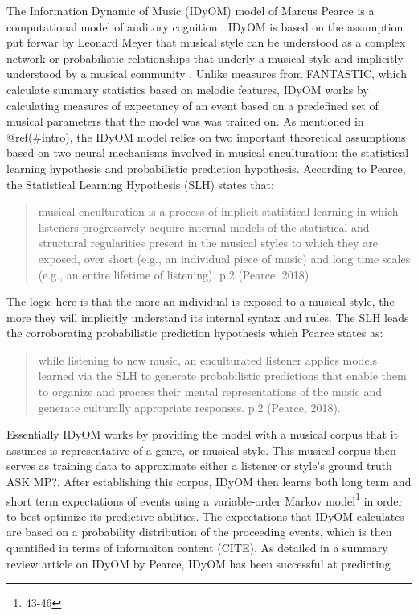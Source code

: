 \documentclass[]{book}
\let\rmarkdownfootnote\footnote%
\def\footnote{\protect\rmarkdownfootnote}
\begin{document}
The Information Dynamic of Music (IDyOM) model of Marcus Pearce is a computational model of auditory cognition \citep{pearceStatisticalLearningProbabilistic2018a}.
IDyOM is based on the assumption put forwar by Leonard Meyer that musical style can be understood as a complex network or probabilistic relationships that underly a musical style and implicitly understood by a musical community \citep{pearceAuditoryExpectationInformation2012, pearceConstructionEvaluationStatistical2005, pearceStatisticalLearningProbabilistic2018a}.
Unlike measures from FANTASTIC, which calculate summary statistics based on melodic features, IDyOM works by calculating measures of expectancy of an event based on a predefined set of musical parameters that the model was was trained on.
As mentioned in @ref(\#intro), the IDyOM model relies on two important theoretical assumptions based on two neural mechanisms involved in musical enculturation: the statistical learning hypothesis and probabilistic prediction hypothesis.
According to Pearce, the Statistical Learning Hypothesis (SLH) states that:

\begin{quote}
musical enculturation is a process of implicit statistical learning in which listeners progressively acquire internal models of the statistical and structural regularities present in the musical styles to which they are exposed, over short (e.g., an individual piece of music) and long time scales (e.g., an entire lifetime of listening). p.2 (Pearce, 2018)
\end{quote}

The logic here is that the more an individual is exposed to a musical style, the more they will implicitly understand its internal syntax and rules.
The SLH leads the corroborating probabilistic prediction hypothesis which Pearce states as:

\begin{quote}
while listening to new music, an enculturated listener applies models learned via the SLH to generate probabilistic predictions that enable them to organize and process their mental representations of the music and generate culturally appropriate responses. p.2 (Pearce, 2018).
\end{quote}

Essentially IDyOM works by providing the model with a musical corpus that it assumes is representative of a genre, or musical style.
This musical corpus then serves as training data to approximate either a listener or style's ground truth ASK MP?.
After establishing this corpus, IDyOM then learns both long term and short term expectations of events using a variable-order Markov model\footnote{43-46} in order to best optimize its predictive abilities.
The expectations that IDyOM calculates are based on a probability distribution of the proceeding events, which is then quantified in terms of informaiton content (CITE).
As detailed in a summary review article on IDyOM by Pearce, IDyOM has been successful at predicting
\end{document}

